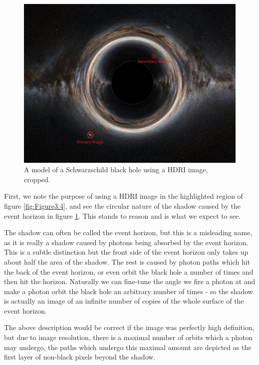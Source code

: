 \documentclass[oneside,openright,frontopenright, singlespacing]{dmathesis}
\begin{document}
\begin{figure}[!ht]
	\centering
	\includegraphics[width=0.8\linewidth]{img/milkyway-SC}
	\caption{A model of a Schwarzschild black hole using a HDRI image, cropped.}
	\label{fig:Figure3.5}
\end{figure}

	First, we note the purpose of using a HDRI image in the highlighted region of figure \ref{fig:Figure3.4}, and see the circular nature of the shadow caused by the event horizon in figure \ref{fig:Figure3.5}. This stands to reason and is what we expect to see. 

\vspace{1em}
	The shadow can often be called the event horizon, but this is a misleading name, as it is really a shadow caused by photons being absorbed by the event horizon. This is a subtle distinction but the front side of the event horizon only takes up about half the area of the shadow. The rest is caused by photon paths which hit the back of the event horizon, or even orbit the black hole a number of times and then hit the horizon. Naturally we can fine-tune the angle we fire a photon at and make a photon orbit the black hole an arbitrary number of times - so the shadow is actually an image of an infinite number of copies of the whole surface of the event horizon.

\vspace{1em}
	The above description would be correct if the image was perfectly high definition, but due to image resolution, there is a maximal number of orbits which a photon may undergo, the paths which undergo this maximal amount are depicted as the first layer of non-black pixels beyond the shadow.
\end{document}
